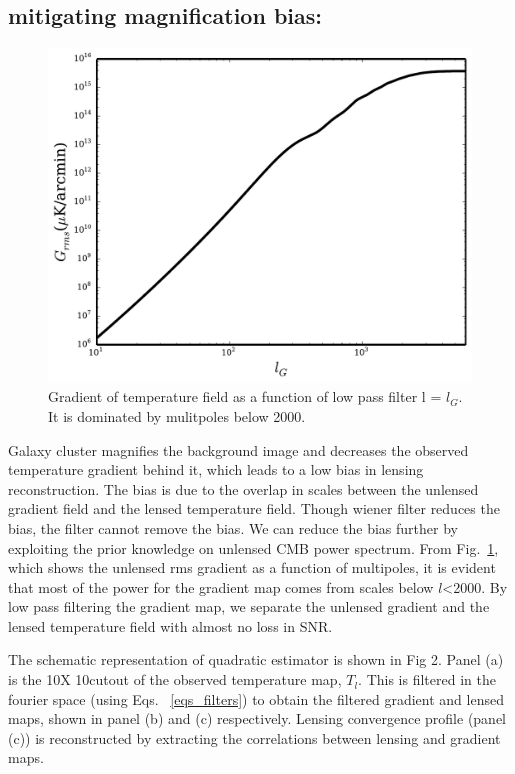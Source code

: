  \subsection*{mitigating magnification bias:}
\begin{figure}[ht]
\includegraphics[width=\columnwidth]{figs/gradient_cut.pdf}
\caption{Gradient of temperature field as a function of low pass filter l = $l_{G}$. It is dominated by mulitpoles below 2000.}
\label{fig:gradient_cut}
\end{figure}
Galaxy cluster magnifies the background image and decreases the observed temperature gradient behind it, which leads to a low bias in lensing reconstruction.
The bias is due to the overlap in scales between the unlensed gradient field and the lensed temperature field. 
Though wiener filter reduces the bias, the filter cannot remove the bias.
We can reduce the bias further by exploiting the prior knowledge on unlensed CMB power spectrum.
 From Fig.~\ref{fig:gradient_cut}, which shows the unlensed rms gradient as a function of multipoles, it is evident that most of the power for the gradient map comes from scales below $l$<2000.
 By low pass filtering the gradient map, we separate the unlensed gradient and the lensed temperature field with almost no loss in SNR.
 
The schematic representation of quadratic estimator is shown in Fig 2. 
Panel (a) is the 10\arcmin X 10\arcmin cutout of the observed temperature map, $T_{l}$.
This is filtered in the fourier space (using Eqs. ~\ref{eqs_filters}) to obtain the filtered gradient and lensed maps, shown in panel (b) and (c) respectively.
Lensing convergence profile (panel (c)) is reconstructed by extracting the correlations between lensing and gradient maps.
 
